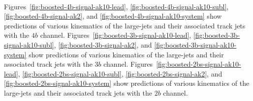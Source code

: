 \paragraph{}
Figures~\ref{fig:boosted-4b-signal-ak10-lead}, \ref{fig:boosted-4b-signal-ak10-subl}, \ref{fig:boosted-4b-signal-ak2}, and \ref{fig:boosted-4b-signal-ak10-system} show predictions of various kinematics of the large-\R jets and their associated track jets with the $4b$ channel.
Figures~\ref{fig:boosted-3b-signal-ak10-lead}, \ref{fig:boosted-3b-signal-ak10-subl}, \ref{fig:boosted-3b-signal-ak2}, and \ref{fig:boosted-3b-signal-ak10-system} show predictions of various kinematics of the large-\R jets and their associated track jets with the $3b$ channel.
Figures~\ref{fig:boosted-2bs-signal-ak10-lead}, \ref{fig:boosted-2bs-signal-ak10-subl}, \ref{fig:boosted-2bs-signal-ak2}, and \ref{fig:boosted-2bs-signal-ak10-system} show predictions of various kinematics of the large-\R jets and their associated track jets with the $2b$ channel.

